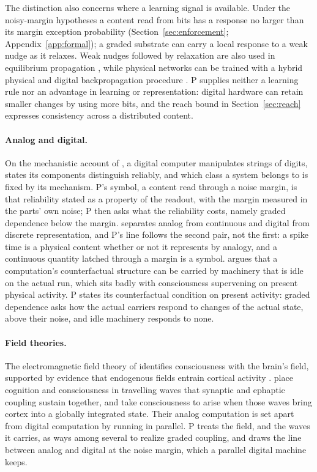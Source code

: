 \documentclass[12pt]{article}
\begin{document}
The distinction also concerns where a learning signal is available. Under the
noisy-margin hypotheses a content read from bits has a response no larger than
its margin exception probability (Section~\ref{sec:enforcement};
Appendix~\ref{app:formal}); a graded substrate can carry a local
response to a weak nudge as it relaxes. Weak nudges followed by relaxation are
also used in equilibrium propagation \citep{scellier2017}, while physical
networks can be trained with a hybrid physical and digital backpropagation
procedure \citep{wright2022}. P supplies neither a learning rule nor an
advantage in learning or representation: digital hardware can retain smaller
changes by using more bits, and the reach bound in Section~\ref{sec:reach}
expresses consistency across a distributed content.

\paragraph{Analog and digital.} On the mechanistic account of
\citet{piccinini2008}, a digital computer manipulates strings of digits, states
its components distinguish reliably, and which class a system belongs to is
fixed by its mechanism. P's symbol, a content read through a noise margin, is
that reliability stated as a property of the readout, with the margin measured
in the parts' own noise; P then asks what the reliability costs, namely graded
dependence below the margin. \citet{maley2011} separates analog from continuous
and digital from discrete representation, and P's line follows the second
pair, not the first: a spike time is a physical content whether or not it
represents by analogy, and a continuous quantity latched through a margin is a
symbol. \citet{maudlin1989} argues that a computation's counterfactual
structure can be carried by machinery that is idle on the actual run, which
sits badly with consciousness supervening on present physical activity. P
states its counterfactual condition on present activity: graded dependence
asks how the actual carriers respond to changes of the actual state, above
their noise, and idle machinery responds to none.

\paragraph{Field theories.} The electromagnetic field theory of
\citet{mcfadden2020} identifies consciousness with the brain's field, supported
by evidence that endogenous fields entrain cortical activity
\citep{frohlich2010}. \citet{miller2026} place cognition and consciousness in
travelling waves that synaptic and ephaptic coupling sustain together, and take
consciousness to arise when those waves bring cortex into a globally integrated
state. Their analog computation is set apart from digital computation by
running in parallel. P treats the field, and the waves it carries, as ways
among several to realize graded coupling, and draws the line between analog
and digital at the noise margin, which a parallel digital machine keeps.
\end{document}
